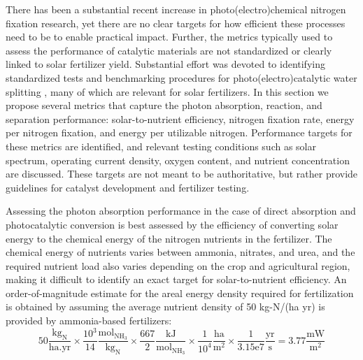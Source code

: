 There has been a substantial recent increase in photo(electro)chemical nitrogen fixation research, yet there are no clear targets for how efficient these processes need to be to enable practical impact. Further, the metrics typically used to assess the performance of catalytic materials are not standardized or clearly linked to solar fertilizer yield. Substantial effort was devoted to identifying standardized tests and benchmarking procedures for photo(electro)catalytic water splitting \cite{Chen_2010, McCrory_2015, Smith_2016, Bligaard_2016}, many of which are relevant for solar fertilizers. In this section we propose several metrics that capture the photon absorption, reaction, and separation performance: solar-to-nutrient efficiency, nitrogen fixation rate, energy per nitrogen fixation, and energy per utilizable nitrogen. Performance targets for these metrics are identified, and relevant testing conditions such as solar spectrum, operating current density, oxygen content, and nutrient concentration are discussed. These targets are not meant to be authoritative, but rather provide guidelines for catalyst development and fertilizer testing.

Assessing the photon absorption performance in the case of direct absorption and photocatalytic conversion is best assessed by the efficiency of converting solar energy to the chemical energy of the nitrogen nutrients in the fertilizer. The chemical energy of nutrients varies between ammonia, nitrates, and urea, and the required nutrient load also varies depending on the crop and agricultural region, making it difficult to identify an exact target for solar-to-nutrient efficiency. An order-of-magnitude estimate for the areal energy density required for fertilization is obtained by assuming the average nutrient density of 50 kg-N/(ha yr) is provided by ammonia-based fertilizers:
\begin{equation}
\mathrm{
50 \frac{kg_N}{ha . yr} \times \frac{10^3}{14} \frac{mol_{NH_3}}{kg_N} \times \frac{667}{2} \frac{kJ}{mol_{NH_3}} \times \frac{1}{10^4} \frac{ha}{m^2} \times \frac{1}{3.15e7} \frac{yr}{s} = 3.77 \frac{mW}{m^2}
}
\end{equation}

